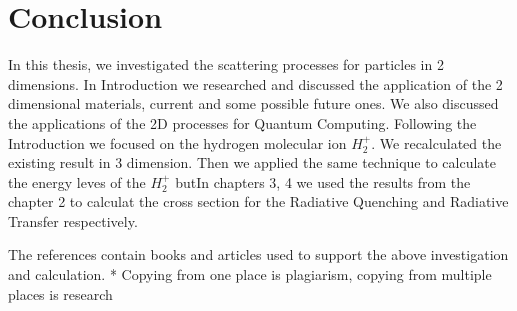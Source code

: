 \chapter{Conclusion}
\label{conclusion}

In this thesis, we investigated the scattering processes for particles in 2 dimensions. In Introduction we researched and discussed the application of the 2 dimensional materials, current and some possible future ones. We also discussed the applications of the 2D processes for Quantum Computing.
Following the Introduction we focused on the hydrogen molecular ion $ H_2^{+} $. We recalculated the existing result in 3 dimension. 
Then we applied the same technique to calculate the energy leves of the $ H_2^{+} $ butIn chapters 3, 4 we used the results from the chapter 2 to calculat the cross section for the Radiative Quenching and Radiative Transfer respectively.

The references contain books and articles used to support the above investigation and calculation.
* Copying from one place is plagiarism, copying from multiple places is research


